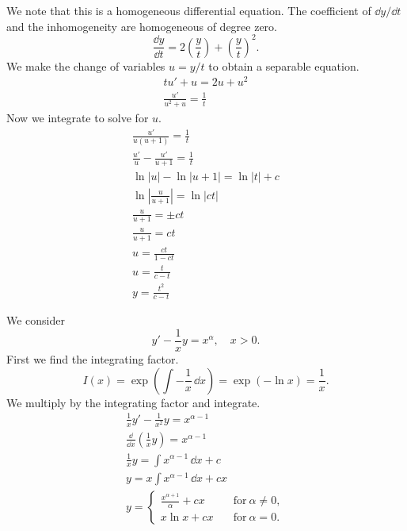 \begin{Solution}
  \label{solution dydt = f(y/t)}
  We note that this is a homogeneous differential equation.  The coefficient
  of $\dd y / \dd t$ and the inhomogeneity are homogeneous of degree zero.
  \[
  \frac{\dd y}{\dd t} 
  = 2 \left( \frac{y}{t} \right) + \left( \frac{y}{t} \right)^2.
  \]
  We make the change of variables $u = y / t$ to obtain a separable equation.
  \begin{gather*}
    t u' + u = 2 u + u^2
    \\
    \frac{u'}{u^2 + u} = \frac{1}{t}
  \end{gather*}
  Now we integrate to solve for $u$.
  \begin{gather*}
    \frac{u'}{u(u + 1)} = \frac{1}{t} 
    \\
    \frac{u'}{u} - \frac{u'}{u + 1} = \frac{1}{t} 
    \\
    \ln |u| - \ln |u + 1| = \ln |t| + c 
    \\
    \ln \left| \frac{u}{u + 1} \right| = \ln |c t| 
    \\
    \frac{u}{u + 1} = \pm c t 
    \\
    \frac{u}{u + 1} = c t 
    \\
    u = \frac{c t}{1 - c t} 
    \\
    u = \frac{t}{c - t} 
    \\
    \boxed{
      y = \frac{t^2}{c - t}
      }
  \end{gather*}
\end{Solution}






\begin{Solution}
  \label{solution y - 1/x y = x alpha}
  We consider
  \[
  y' - \frac{1}{x} y = x^{\alpha}, \quad x > 0.
  \]
  First we find the integrating factor.
  \[
  I(x) = \exp\left( \int -\frac{1}{x} \,\dd x \right)
  = \exp\left( -\ln x \right)
  = \frac{1}{x}.
  \]
  We multiply by the integrating factor and integrate.
  \begin{gather*}
    \frac{1}{x} y' - \frac{1}{x^2} y = x^{\alpha - 1} 
    \\
    \frac{\dd}{\dd x} \left( \frac{1}{x} y \right) = x^{\alpha - 1} 
    \\
    \frac{1}{x} y = \int x^{\alpha - 1} \,\dd x + c 
    \\
    y = x \int x^{\alpha - 1} \,\dd x + c x
    \\
    \boxed{
      y = 
      \begin{cases}
        \frac{x^{\alpha + 1}}{\alpha} + c x \quad &\mathrm{for}\ \alpha \neq 0, 
        \\
        x \ln x + c x \quad &\mathrm{for}\ \alpha = 0.
      \end{cases}
      }
  \end{gather*}
\end{Solution}






